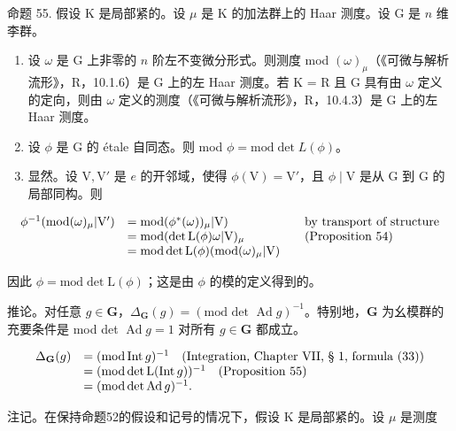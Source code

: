 命题 55. 假设 K 是局部紧的。设 \(\mu\) 是 K 的加法群上的 Haar 测度。设 G 是 \(n\) 维李群。

\begin{enumerate}
\def\labelenumi{(\roman{enumi})}
\item
  设 \(\omega\) 是 G 上非零的 \(n\) 阶左不变微分形式。则测度 mod \((\omega)_{\mu}\)（《可微与解析流形》，R，10.1.6）是 G 上的左 Haar 测度。若 K = R 且 G 具有由 \(\omega\) 定义的定向，则由 \(\omega\) 定义的测度（《可微与解析流形》，R，10.4.3）是 G 上的左 Haar 测度。
\item
  设 \(\phi\) 是 G 的 étale 自同态。则 mod \(\phi = \text{mod}\det L(\phi)\)。
\item
  显然。设 \(\mathrm{V}, \mathrm{V}'\) 是 \(e\) 的开邻域，使得 \(\phi(\mathrm{V}) = \mathrm{V}'\)，且 \(\phi \mid \mathrm{V}\) 是从 \(\mathrm{G}\) 到 \(\mathrm{G}\) 的局部同构。则
\end{enumerate}

\[
\begin{array}{r l r l} \phi^ {- 1} (\mathrm{mod} (\omega) _ {\mu}   |   \mathrm{V} ^ {\prime}) & = \mathrm{mod} (\phi^ {*} (\omega)) _ {\mu}   |   \mathrm{V}) & & \text {by transport of structure} \\ & = \mathrm{mod} (\det \mathrm{L} (\phi) \omega   |   \mathrm{V}) _ {\mu} & & \text {(Proposition 54)} \\ & = \mathrm{mod} \det \mathrm{L} (\phi) (\mathrm{mod} (\omega) _ {\mu}   |   \mathrm{V}) \end{array}
\]

因此 \(\phi = \mathrm{mod}\det \mathrm{L}(\phi)\)；这是由 \(\phi\) 的模的定义得到的。

推论。对任意 \(g \in \mathbf{G}\)，\(\Delta_{\mathbf{G}}(g) = (\text{mod det } \operatorname{Ad} g)^{-1}\)。特别地，\(\mathbf{G}\) 为幺模群的充要条件是 mod det \(\operatorname{Ad} g = 1\) 对所有 \(g \in \mathbf{G}\) 都成立。

\[
\begin{array}{r l} \Delta_ {\mathbf {G}} (g) & = (\text {mod} \operatorname{Int} g) ^ {- 1} \quad \text {(Integration, Chapter VII, § 1, formula (33))} \\ & = (\text {mod} \det \operatorname{L} (\operatorname{Int} g)) ^ {- 1} \quad \text {(Proposition 55)} \\ & = (\text {mod} \det \operatorname{Ad} g) ^ {- 1}. \end{array}
\]

注记。在保持命题52的假设和记号的情况下，假设 K 是局部紧的。设 \(\mu\) 是测度

